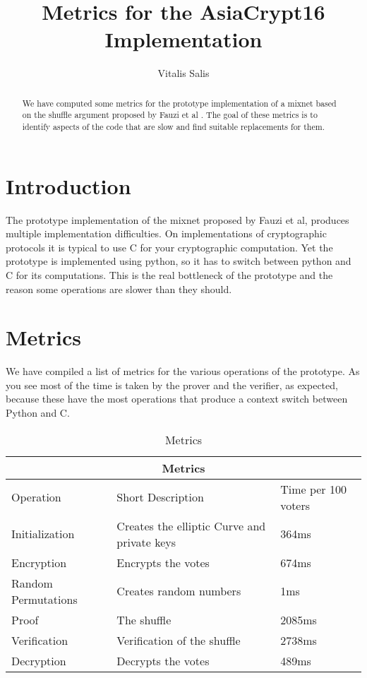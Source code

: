 \documentclass{article}
\date{}
\begin{document}
\title{Metrics for the AsiaCrypt16 Implementation} 

\author{Vitalis Salis}

\maketitle
\begin{abstract}
	We have computed some metrics for the prototype implementation \cite{prototype} of a mixnet based
    on the shuffle argument proposed by Fauzi et al \cite{shufflearg}. The goal of these metrics
    is to identify aspects of the code that are slow and find suitable replacements
    for them.
\end{abstract}

\section{Introduction}

The prototype implementation of the mixnet proposed by Fauzi et al, produces multiple
implementation difficulties. On implementations of cryptographic protocols it is typical
to use C for your cryptographic computation. Yet the prototype is implemented using python,
so it has to switch between python and C for its computations. This is the real bottleneck
of the prototype and the reason some operations are slower than they should.

\section{Metrics}

We have compiled a list of metrics for the various operations of the prototype. As you see
most of the time is taken by the prover and the verifier, as expected, because these have
the most operations that produce a context switch between Python and C.

\begin{table}
\begin{tabular}{ |p{3cm}|p{5cm}|p{3cm}|  }
    \hline
    \multicolumn{3}{|c|}{Metrics}\\
    \hline
    Operation & Short Description & Time per 100 voters\\
    \hline
    Initialization & Creates the elliptic Curve and private keys & 364ms\\
    Encryption & Encrypts the votes & 674ms\\
    Random Permutations & Creates random numbers & 1ms\\
    Proof & The shuffle & 2085ms\\
    Verification & Verification of the shuffle & 2738ms\\
    Decryption & Decrypts the votes & 489ms\\
    \hline
\end{tabular}
\caption{Metrics}
\end{table}
\end{document}
